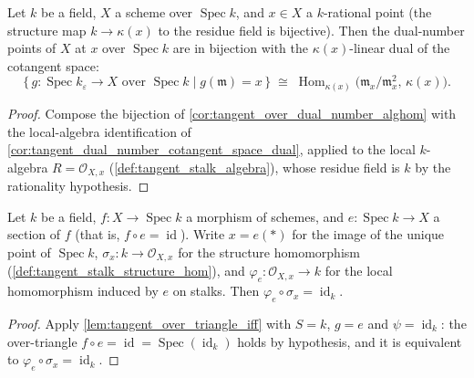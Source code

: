 \begin{theorem}\leanok
  \label{thm:tangent_over_dual_number_cotangent_dual}
  Let \(k\) be a field, \(X\) a scheme over \(\operatorname{Spec} k\),
  and \(x \in X\) a \(k\)-rational point (the structure map
  \(k \to \kappa(x)\) to the residue field is bijective). Then the
  dual-number points of \(X\) at \(x\) over \(\operatorname{Spec} k\)
  are in bijection with the \(\kappa(x)\)-linear dual of the cotangent
  space:
  \[
    \{\, g : \operatorname{Spec} k_\varepsilon \to X
        \text{ over } \operatorname{Spec} k
        \mid g(\mathfrak m) = x \,\}
    \;\cong\;
    \operatorname{Hom}_{\kappa(x)}\!\bigl(\mathfrak m_x/\mathfrak m_x^2,\,
      \kappa(x)\bigr).
  \]
\end{theorem}

\begin{proof}\leanok
  Compose the bijection of \cref{cor:tangent_over_dual_number_alghom}
  with the local-algebra identification of
  \cref{cor:tangent_dual_number_cotangent_space_dual}, applied to the
  local \(k\)-algebra \(R = \mathcal O_{X,x}\)
  (\cref{def:tangent_stalk_algebra}), whose residue field is \(k\) by
  the rationality hypothesis.
\end{proof}

\begin{lemma}\leanok
  \label{lem:tangent_section_retraction}
  Let \(k\) be a field, \(f : X \to \operatorname{Spec} k\) a morphism
  of schemes, and \(e : \operatorname{Spec} k \to X\) a section of
  \(f\) (that is, \(f \circ e = \operatorname{id}\)). Write
  \(x = e(*)\) for the image of the unique point of
  \(\operatorname{Spec} k\), \(\sigma_x : k \to \mathcal O_{X,x}\) for
  the structure homomorphism
  (\cref{def:tangent_stalk_structure_hom}), and
  \(\varphi_e : \mathcal O_{X,x} \to k\) for the local homomorphism
  induced by \(e\) on stalks. Then
  \(\varphi_e \circ \sigma_x = \operatorname{id}_k\).
\end{lemma}

\begin{proof}\leanok
  Apply \cref{lem:tangent_over_triangle_iff} with \(S = k\),
  \(g = e\) and \(\psi = \operatorname{id}_k\): the over-triangle
  \(f \circ e = \operatorname{id} =
  \operatorname{Spec}(\operatorname{id}_k)\) holds by hypothesis, and
  it is equivalent to \(\varphi_e \circ \sigma_x =
  \operatorname{id}_k\).
\end{proof}

